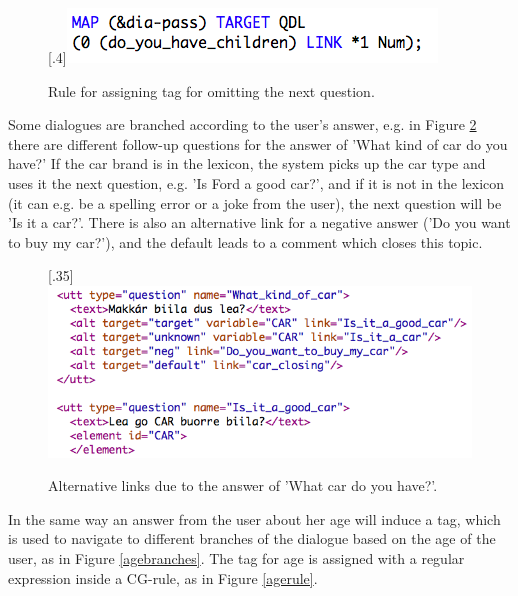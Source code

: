 \documentclass[11pt]{article}
\begin{document}
\begin{figure}[htbp]
\begin{center}
\scalebox{.4}[.4]{\includegraphics{presentation/img/passchildren.png}}\\
\caption{Rule for assigning tag for omitting the next question.}
\label{omit}
\end{center}
\end{figure}

 
 
Some dialogues are branched according to the user's answer, e.g. in Figure \ref{car} there are different follow-up questions for the answer of 'What kind of car do you have?' If the car brand is in the lexicon, the system picks up the car type and uses it the next question, e.g. 'Is Ford a good car?', and if it is not in the lexicon (it can e.g. be a spelling error or a joke from the user), the next question will be 'Is it a car?'. There is also an alternative link for a negative answer ('Do you want to buy my car?'), and the default leads to a comment which closes this topic. \\

\begin{figure}[htbp]
\begin{center}
\scalebox{.35}[.35]{\includegraphics{presentation/img/what_car.png}}\\
\caption{Alternative links due to the answer of 'What car do you have?'.}
\label{car}
\end{center}
\end{figure}

In the same way an answer from the user about her age will induce a tag, which is used to navigate to different branches of the dialogue based on the age of the user, as in Figure \ref{agebranches}. The tag for age is assigned with a regular expression inside a CG-rule, as in Figure \ref{agerule}. \\
\end{document}
